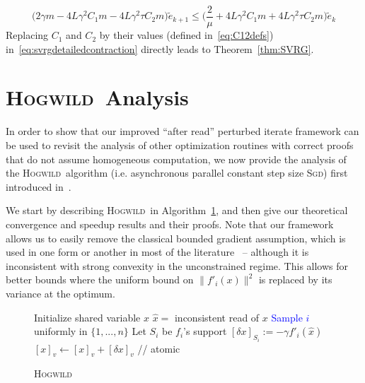 \documentclass[twoside, 11pt]{article}
\newcommand{\stepsize}{\gamma}
\newcommand{\strongconvex}{\mu}
\newcommand{\overlap}{\tau}
\newcommand{\lipschitz}{L}
\newcommand{\Hogwild}{\textsc{Hogwild}}
\newcommand{\SGD}{\textsc{Sgd}}
\begin{document}
\begin{equation}\label{eq:svrgdetailedcontraction}
\big(2\stepsize m - 4\lipschitz \stepsize^2 C_1 m - 4\lipschitz \stepsize^2 \overlap C_2 m\big) \tilde e_{k+1}
\leq
\big(\frac{2}{\strongconvex} + 4\lipschitz \stepsize^2 C_1 m + 4 \lipschitz \stepsize^2\overlap C_2 m\big) \tilde e_k
\end{equation}
Replacing $C_1$ and $C_2$ by their values (defined in~\ref{eq:C12defs}) in~\eqref{eq:svrgdetailedcontraction} directly leads to Theorem~\ref{thm:SVRG}.

\section{\Hogwild\ Analysis}\label{sec:SGD}
In order to show that our improved ``after read'' perturbed iterate framework can be used to revisit the analysis of other optimization routines with correct proofs that do not assume homogeneous computation, we now provide the analysis of the \Hogwild\ algorithm (i.e. asynchronous parallel constant step size \SGD) first introduced in~\citet{hogwild}.

We start by describing \Hogwild\ in Algorithm~\ref{alg:hogwild}, and then give our theoretical convergence and speedup results and their proofs.
Note that our framework allows us to easily remove the classical bounded gradient assumption, which is used in one form or another in most of the literature~\citep{hogwild, taming, mania} -- although it is inconsistent with strong convexity in the unconstrained regime.
This allows for better bounds where the uniform bound on $\|f'_i(x)\|^2$ is replaced by its variance at the optimum.

\begin{figure}[ttt!]
	\centering
 \begin{minipage}[t]{0.49\textwidth}
 \vspace{\dimexpr\ht\strutbox-\topskip}
   \begin{algorithm}[H]
     \caption{\Hogwild}
     \label{alg:hogwild}
     \begin{algorithmic}[1]
	   \STATE Initialize shared variable $x$
	   \LOOP
	      \STATE $\hat x = $ inconsistent read of $x$
	      \STATE \textcolor{blue}{Sample $i$}  uniformly in $\{1,...,n\}$
	      \STATE Let $S_i$ be $f_i$'s support
    	      \STATE $[\delta x]_{S_i} := -\stepsize f'_i(\hat x)$
        		 \STATE $[x]_v \leftarrow [x]_v + [\delta x]_v$      \hfill // atomic
          \ENDFOR
	   \ENDLOOP
	  \end{algorithmic}
    \end{algorithm}
 \end{minipage}
\end{figure}
\end{document}

